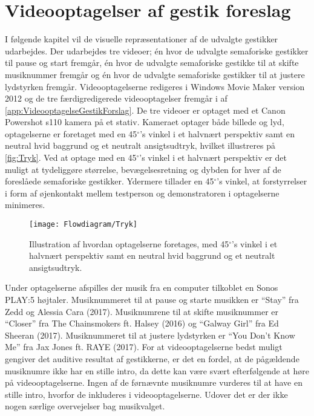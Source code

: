 \chapter{Videooptagelser af gestik foreslag}
\label{app:VideooptagelserValgAfGestikker}
%
I følgende kapitel vil de visuelle repræsentationer af de udvalgte gestikker udarbejdes. Der udarbejdes tre videoer; én hvor de udvalgte semaforiske gestikker til pause og start fremgår, én hvor de udvalgte semaforiske gestikke til at skifte musiknummer fremgår og én hvor de udvalgte semaforiske gestikker til at justere lydstyrken fremgår. Videooptagelserne redigeres i Windows Movie Maker version 2012 og de tre færdigredigerede videooptagelser fremgår i af \autoref{app:VideooptagelseGestikForslag}.\blankline
%
De tre videoer er optaget med et Canon Powershot s110 kamera på et stativ. Kameraet optager både billede og lyd, optagelserne er foretaget med en 45$^{\circ}$'s vinkel i et halvnært perspektiv samt en neutral hvid baggrund og et neutralt ansigtsudtryk, hvilket illustreres på \autoref{fig:Tryk}. Ved at optage med en 45$^{\circ}$'s vinkel i et halvnært perspektiv er det muligt at tydeliggøre størrelse, bevægelsesretning og dybden for hver af de foreslåede semaforiske gestikker. Ydermere tillader en 45$^{\circ}$'s vinkel, at forstyrrelser i form af øjenkontakt mellem testperson og demonstratoren i optagelserne minimeres. 
%
\begin{figure}[H]
	\centering
	\texttt{[image: Flowdiagram/Tryk]}
	\caption{Illustration af hvordan optagelserne foretages, med 45$^{\circ}$'s vinkel i et halvnært perspektiv samt en neutral hvid baggrund og et neutralt ansigtsudtryk.}
	\label{fig:Tryk}
\end{figure}
\noindent
%
Under optagelserne afspilles der musik fra en computer tilkoblet en Sonos PLAY:5 højtaler. Musiknummeret til at pause og starte musikken er \enquote{Stay} fra Zedd og Alessia Cara (2017). Musiknumrene til at skifte musiknummer er \enquote{Closer} fra The Chainsmokers ft. Halsey (2016) og \enquote{Galway Girl} fra Ed Sheeran (2017). Musiknummeret til at justere lydstyrken er \enquote{You Don't Know Me} fra Jax Jones ft. RAYE (2017). For at videooptagelserne bedst muligt gengiver det auditive resultat af gestikkerne, er det en fordel, at de pågældende musiknumre ikke har en stille intro, da dette kan være svært efterfølgende at høre på videooptagelserne. Ingen af de førnævnte musiknumre vurderes til at have en stille intro, hvorfor de inkluderes i videooptagelserne. Udover det er der ikke nogen særlige overvejelser bag musikvalget. 

